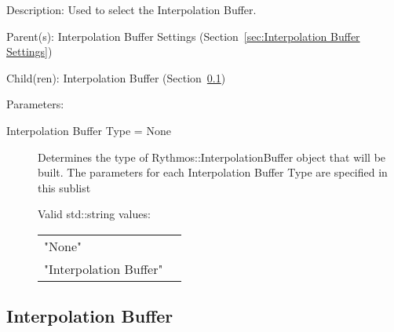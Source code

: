\begin{list}{}
  {\setlength{\leftmargin}{1.0in}
   \setlength{\labelwidth}{0.75in}
   \setlength{\labelsep}{0.125in}}
  \item[Description:]
    Used to select the Interpolation Buffer.
  \item[Parent(s):]
    Interpolation Buffer Settings (Section~\ref{sec:Interpolation Buffer Settings})
  \item[Child(ren):]
    Interpolation Buffer (Section~\ref{sec:Interpolation Buffer})
  \item[Parameters:]
    \begin{description}
      \item[Interpolation Buffer Type = None] 
Determines the type of Rythmos::InterpolationBuffer object that will be built.
The parameters for each Interpolation Buffer Type are specified in this sublist

  Valid std::string values:

      \begin{tabular}{lp{}}
      "None" & \\ 
      "Interpolation Buffer" & \\ 
      \end{tabular}
\end{description}

\end{list}

\subsection{Interpolation Buffer}
\label{sec:Interpolation Buffer}


